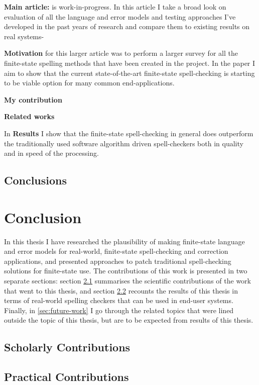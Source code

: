 \documentclass[officiallayout,draft]{unihelcompling}
\begin{document}
\textbf{Main article:} is work-in-progress. In this article I take a broad
look on evaluation of all the language and error models and testing approaches
I've developed in the past years of research and compare them to existing
results on real systems-

\textbf{Motivation} for this larger article was to perform a larger survey
for all the finite-state spelling methods that have been created in the
project. In the paper I aim to show that the current state-of-the-art
finite-state spell-checking is starting to be viable option for many
common end-applications.

\textbf{My contribution}

\textbf{Related works}

In \textbf{Results} I show that the finite-state spell-checking in general
does outperform the traditionally used software algorithm driven spell-checkers
both in quality and in speed of the processing.

\section{Conclusions}

\chapter{Conclusion}
\label{chap:conclusion}

In this thesis I have researched the plausibility of making finite-state
language and error models for real-world, finite-state spell-checking and
correction applications, and presented approaches to patch traditional
spell-checking solutions for finite-state use. The contributions of this work
is presented in two separate sections: section
\ref{sec:scholarly-contributions} summarises the scientific contributions of
the work that went to this thesis, and section
\ref{sec:practical-contributions} recounts the results of this thesis in terms
of real-world spelling checkers that can be used in end-user systems. Finally,
in \ref{sec:future-work} I go through the related topics that were lined
outside the topic of this thesis, but are to be expected from results of this
thesis.

\section{Scholarly Contributions}
\label{sec:scholarly-contributions}

\section{Practical Contributions}
\label{sec:practical-contributions}
\end{document}

